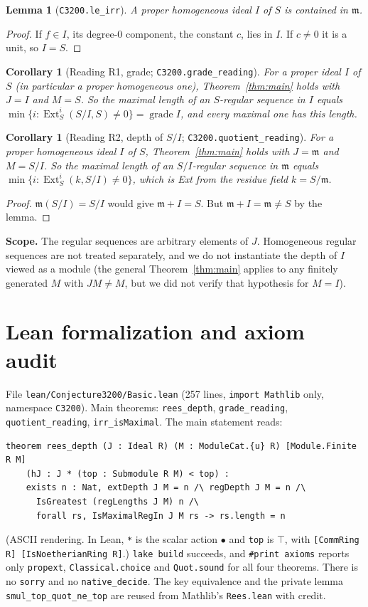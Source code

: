 \documentclass[11pt]{article}
\newtheorem{lemma}[theorem]{Lemma}
\newtheorem{corollary}[theorem]{Corollary}
\theoremstyle{definition}
\newcommand{\Ext}{\operatorname{Ext}}
\begin{document}
\begin{lemma}[\texttt{C3200.le\_irr}]
A proper homogeneous ideal $I$ of $S$ is contained in $\mathfrak m$.
\end{lemma}
\begin{proof}
If $f\in I$, its degree-$0$ component, the constant $c$, lies in $I$. If $c\neq0$ it is a unit, so
$I=S$.
\end{proof}

\begin{corollary}[Reading R1, grade; \texttt{C3200.grade\_reading}]
For a proper ideal $I$ of $S$ (in particular a proper homogeneous one), Theorem~\ref{thm:main} holds
with $J=I$ and $M=S$. So the maximal length of an $S$-regular sequence in $I$ equals
$\min\{i:\Ext^i_S(S/I,S)\neq0\}=\operatorname{grade}I$, and every maximal one has this length.
\end{corollary}

\begin{corollary}[Reading R2, depth of $S/I$; \texttt{C3200.quotient\_reading}]
For a proper homogeneous ideal $I$ of $S$, Theorem~\ref{thm:main} holds with $J=\mathfrak m$ and
$M=S/I$. So the maximal length of an $S/I$-regular sequence in $\mathfrak m$ equals
$\min\{i:\Ext^i_S(k,S/I)\neq0\}$, which is Ext from the residue field $k=S/\mathfrak m$.
\end{corollary}
\begin{proof}
$\mathfrak m(S/I)=S/I$ would give $\mathfrak m+I=S$. But $\mathfrak m+I=\mathfrak m\neq S$ by the
lemma.
\end{proof}

\textbf{Scope.} The regular sequences are arbitrary elements of $J$. Homogeneous regular sequences are
not treated separately, and we do not instantiate the depth of $I$ viewed as a module (the general
Theorem~\ref{thm:main} applies to any finitely generated $M$ with $JM\neq M$, but we did not verify
that hypothesis for $M=I$).

\section{Lean formalization and axiom audit}

File \texttt{lean/Conjecture3200/Basic.lean} (257 lines, \texttt{import Mathlib} only, namespace
\texttt{C3200}). Main theorems: \texttt{rees\_depth}, \texttt{grade\_reading},
\texttt{quotient\_reading}, \texttt{irr\_isMaximal}. The main statement reads:
\begin{verbatim}
theorem rees_depth (J : Ideal R) (M : ModuleCat.{u} R) [Module.Finite R M]
    (hJ : J * (top : Submodule R M) < top) :
    exists n : Nat, extDepth J M = n /\ regDepth J M = n /\
      IsGreatest (regLengths J M) n /\
      forall rs, IsMaximalRegIn J M rs -> rs.length = n
\end{verbatim}
(ASCII rendering. In Lean, \texttt{*} is the scalar action $\bullet$ and \texttt{top} is $\top$, with
\texttt{[CommRing R] [IsNoetherianRing R]}.) \texttt{lake build} succeeds, and
\texttt{\#print axioms} reports only \texttt{propext}, \texttt{Classical.choice} and
\texttt{Quot.sound} for all four theorems. There is no \texttt{sorry} and no \texttt{native\_decide}.
The key equivalence and the private lemma \texttt{smul\_top\_quot\_ne\_top} are reused from Mathlib's
\texttt{Rees.lean} with credit.
\end{document}

